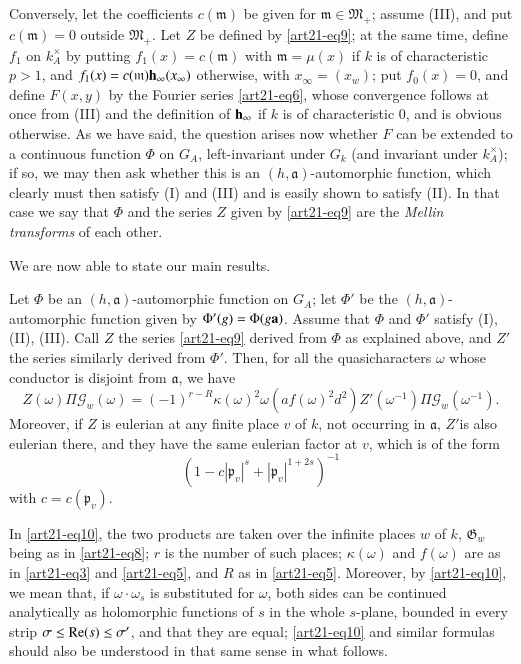 Conversely, let the coefficients $c(\mathfrak{m})$ be given for $\mathfrak{m}\in \mathfrak{M}_{+}$; assume (III), and put $c(\mathfrak{m})=0$ outside $\mathfrak{M}_{+}$. Let $Z$ be defined by \eqref{art21-eq9}; at the same time, define $f_{1}$ on $k^{\times}_{A}$ by putting $f_{1}(x)=c(\mathfrak{m})$ with $\mathfrak{m}=\mu(x)$ if $k$ is of characteristic $p>1$, and $f_{1}(x)=c(\mathfrak{m})\mathbf{h}_{\infty}(x_{\infty})$ otherwise, with $x_{\infty}=(x_{w})$; put $f_{0}(x)=0$, and define $F(x,y)$ by the Fourier series \eqref{art21-eq6}, whose convergence follows at once from (III) and the definition of $\mathbf{h}_{\infty}$ if $k$ is of characteristic $0$, and is obvious otherwise. As we have said, the question arises now whether $F$ can be extended to a continuous function $\Phi$ on $G_{A}$, left-invariant under $G_{k}$ (and invariant under $k^{\times}_{A}$); if so, we may then ask whether this is an $(h,\mathfrak{a})$-automorphic function, which clearly must then satisfy (I) and (III) and is easily shown to satisfy (II). In that case we say that $\Phi$ and the series $Z$ given by \eqref{art21-eq9} are the {\em Mellin transforms} of each other. 

We are now able to state our main results.

\begin{theorem}\label{art21-thm1}
Let $\Phi$ be an $(h,\mathfrak{a})$-automorphic function on $G_{A}$; let $\Phi'$ be the $(h,\mathfrak{a})$-automorphic function given by $\Phi'(g)=\Phi(g\mathbf{a})$. Assume that $\Phi$ and $\Phi'$ satisfy {\rm (I), (II), (III)}. Call $Z$ the series \eqref{art21-eq9} derived from $\Phi$ as explained above, and $Z'$ the series similarly derived from $\Phi'$. Then, for all the quasicharacters $\omega$ whose conductor is disjoint from $\mathfrak{a}$, we have
\begin{equation}
Z(\omega)\Pi \mathscr{G}_{w}(\omega)=(-1)^{r-R}\kappa(\omega)^{2}\omega(af(\omega)^{2}d^{2})Z'(\omega^{-1})\Pi \mathscr{G}_{w}(\omega^{-1}).\label{art21-eq10}
\end{equation}
Moreover, if $Z$ is eulerian at any finite place $v$ of $k$, not occurring in $\mathfrak{a}$, $Z'$\pageoriginale is also eulerian there, and they have the same eulerian factor at $v$, which is of the form
\begin{equation}
(1-c|\mathfrak{p}_{v}|^{s}+|\mathfrak{p}_{v}|^{1+2s})^{-1}\label{art21-eq11}
\end{equation}
with $c=c(\mathfrak{p}_{v})$.
\end{theorem}

In \eqref{art21-eq10}, the two products are taken over the infinite places $w$ of $k$, $\mathfrak{G}_{w}$ being as in \eqref{art21-eq8}; $r$ is the number of such places; $\kappa(\omega)$ and $f(\omega)$ are as in \eqref{art21-eq3} and \eqref{art21-eq5}, and $R$ as in \eqref{art21-eq5}. Moreover, by \eqref{art21-eq10}, we mean that, if $\omega\cdot \omega_{s}$ is substituted for $\omega$, both sides can be continued analytically as holomorphic functions of $s$ in the whole $s$-plane, bounded in every strip $\sigma \leq \operatorname{\mathrm{Re}}(s)\leq \sigma'$, and that they are equal; \eqref{art21-eq10} and similar formulas should also be understood in that same sense in what follows.

